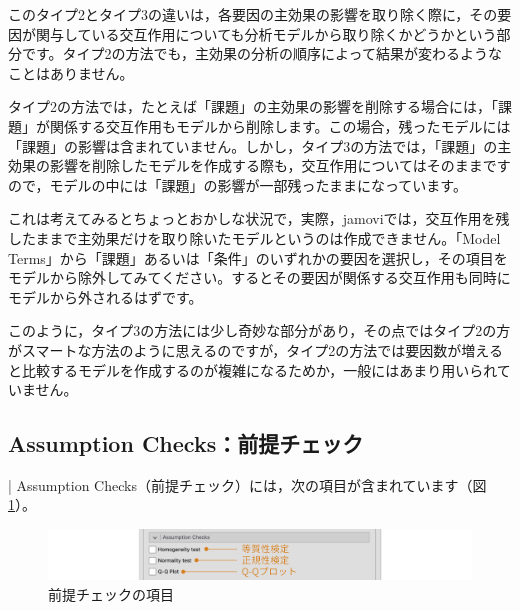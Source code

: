 \documentclass[
  12pt,
  a5jpaper,
  lualatex, ja=standard]{bxjsbook}
\begin{document}
このタイプ2とタイプ3の違いは，各要因の主効果の影響を取り除く際に，その要因が関与している交互作用についても分析モデルから取り除くかどうかという部分です。タイプ2の方法でも，主効果の分析の順序によって結果が変わるようなことはありません。

タイプ2の方法では，たとえば「課題」の主効果の影響を削除する場合には，「課題」が関係する交互作用もモデルから削除します。この場合，残ったモデルには「課題」の影響は含まれていません。しかし，タイプ3の方法では，「課題」の主効果の影響を削除したモデルを作成する際も，交互作用についてはそのままですので，モデルの中には「課題」の影響が一部残ったままになっています。

これは考えてみるとちょっとおかしな状況で，実際，jamoviでは，交互作用を残したままで主効果だけを取り除いたモデルというのは作成できません。「Model Terms」から「課題」あるいは「条件」のいずれかの要因を選択し，その項目をモデルから除外してみてください。するとその要因が関係する交互作用も同時にモデルから外されるはずです。

このように，タイプ3の方法には少し奇妙な部分があり，その点ではタイプ2の方がスマートな方法のように思えるのですが，タイプ2の方法では要因数が増えると比較するモデルを作成するのが複雑になるためか，一般にはあまり用いられていません。

\hypertarget{sub:ANOVA-anova-assumption-checks}{%
\subsection{Assumption Checks：前提チェック}\label{sub:ANOVA-anova-assumption-checks}}

\colorbox{bar}{\textcolor{gmoji2}{| Assumption Checks}}（前提チェック）には，次の項目が含まれています（図\ref{fig:ANOVA-anova-assumption-checks}）。

\begin{figure}[!ht]

{\centering \includegraphics[width=1\linewidth]{images/ANOVA/anova-assumption-checks} 

}

\caption{前提チェックの項目}\label{fig:ANOVA-anova-assumption-checks}
\end{figure}
\end{document}
